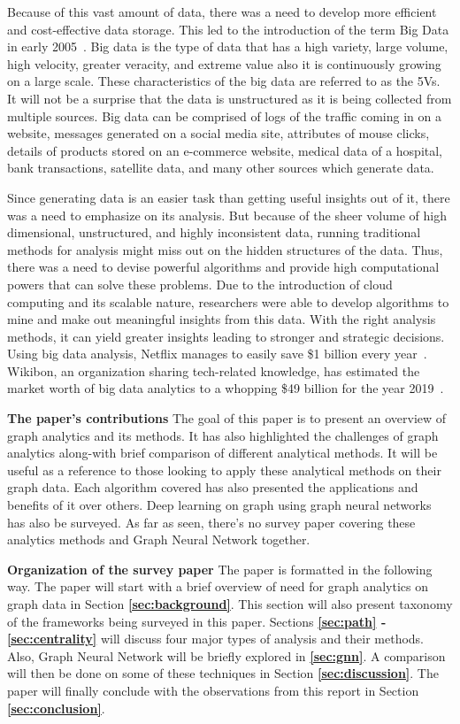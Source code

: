 \documentclass[journal,twoside,web]{ieeecolor}
\begin{document}
Because of this vast amount of data, there was a need to develop more efficient and cost-effective data storage. This led to the introduction of the term Big Data in early 2005~\cite{4}. Big data is the type of data that has a high variety, large volume, high velocity, greater veracity, and extreme value also it is continuously growing on a large scale. These characteristics of the big data are referred to as the 5Vs. It will not be a surprise that the data is unstructured as it is being collected from multiple sources. Big data can be comprised of logs of the traffic coming in on a website, messages generated on a social media site, attributes of mouse clicks, details of products stored on an e-commerce website, medical data of a hospital, bank transactions, satellite data, and many other sources which generate data.

Since generating data is an easier task than getting useful insights out of it, there was a need to emphasize on its analysis. But because of the sheer volume of high dimensional, unstructured, and highly inconsistent data, running traditional methods for analysis might miss out on the hidden structures of the data. Thus, there was a need to devise powerful algorithms and provide high computational powers that can solve these problems. Due to the introduction of cloud computing and its scalable nature, researchers were able to develop algorithms to mine and make out meaningful insights from this data. With the right analysis methods, it can yield greater insights leading to stronger and strategic decisions. Using big data analysis, Netflix manages to easily save \$1 billion every year~\cite{5}. Wikibon, an organization sharing tech-related knowledge, has estimated the market worth of big data analytics to a whopping \$49 billion for the year 2019~\cite{6}.

\textbf{The paper's contributions} The goal of this paper is to present an overview of graph analytics and its methods. It has also highlighted the challenges of graph analytics along-with brief comparison of different analytical methods. It will be useful as a reference to those looking to apply these analytical methods on their graph data. Each algorithm covered has also presented the applications and benefits of it over others. Deep learning on graph using graph neural networks has also be surveyed. As far as seen, there's no survey paper covering these analytics methods and Graph Neural Network together.

\textbf{Organization of the survey paper} The paper is formatted in the following way. The paper will start with a brief overview of need for graph analytics on graph data in Section \textbf{\ref{sec:background}}. This section will also present taxonomy of the frameworks being surveyed in this paper. Sections \textbf{\ref{sec:path} - \ref{sec:centrality}} will discuss four major types of analysis and their methods. Also, Graph Neural Network will be briefly explored in \textbf{\ref{sec:gnn}}. A comparison will then be done on some of these techniques in Section \textbf{\ref{sec:discussion}}. The paper will finally conclude with the observations from this report in Section \textbf{\ref{sec:conclusion}}.
\end{document}
